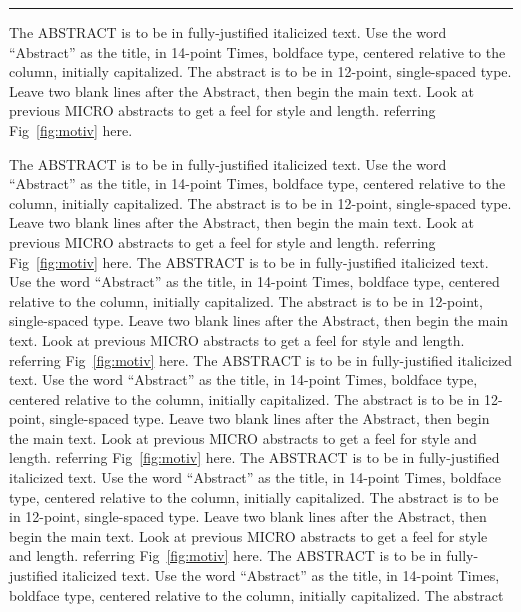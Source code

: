 \begin{figure*} [t]
\centering
 \hrule
 \caption{\label{fig:motiv} \scriptsize \bf Caption.}
\end{figure*}

The ABSTRACT is to be in fully-justified italicized text. Use the word ``Abstract'' as the title, in
14-point Times, boldface type, centered relative to the column, initially capitalized. The abstract
is to be in 12-point, single-spaced type. Leave two blank lines after the Abstract, then begin the
main text. Look at previous MICRO abstracts to get a feel for style and length. referring
Fig~\ref{fig:motiv} here.

The ABSTRACT is to be in fully-justified italicized text. Use the word ``Abstract'' as the title, in
14-point Times, boldface type, centered relative to the column, initially capitalized. The abstract
is to be in 12-point, single-spaced type. Leave two blank lines after the Abstract, then begin the
main text. Look at previous MICRO abstracts to get a feel for style and length. referring
Fig~\ref{fig:motiv} here. The ABSTRACT is to be in fully-justified italicized text. Use the word
``Abstract'' as the title, in 14-point Times, boldface type, centered relative to the column,
initially capitalized. The abstract is to be in 12-point, single-spaced type. Leave two blank lines
after the Abstract, then begin the main text. Look at previous MICRO abstracts to get a feel for
style and length. referring Fig~\ref{fig:motiv} here. The ABSTRACT is to be in fully-justified
italicized text. Use the word ``Abstract'' as the title, in 14-point Times, boldface type, centered
relative to the column, initially capitalized. The abstract is to be in 12-point, single-spaced type.
Leave two blank lines after the Abstract, then begin the main text. Look at previous MICRO abstracts
to get a feel for style and length. referring Fig~\ref{fig:motiv} here. The ABSTRACT is to be in
fully-justified italicized text. Use the word ``Abstract'' as the title, in 14-point Times, boldface
type, centered relative to the column, initially capitalized. The abstract is to be in 12-point,
single-spaced type. Leave two blank lines after the Abstract, then begin the main text. Look at
previous MICRO abstracts to get a feel for style and length. referring Fig~\ref{fig:motiv} here. The
ABSTRACT is to be in fully-justified italicized text. Use the word ``Abstract'' as the title, in
14-point Times, boldface type, centered relative to the column, initially capitalized. The abstract
